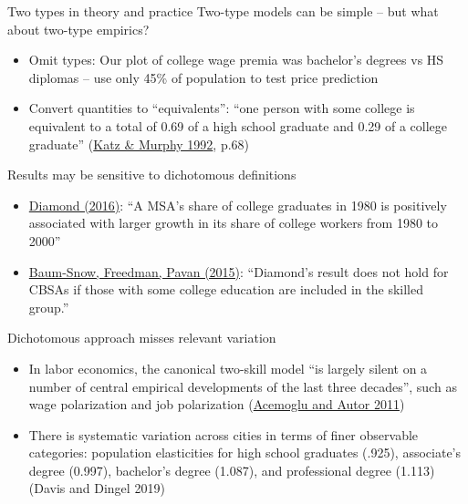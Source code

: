 \documentclass[10pt,notes=hide]{beamer}
\begin{document}
\begin{frame}{Two types in theory and practice}
Two-type models can be simple -- but what about two-type empirics?
\begin{itemize}
	\item Omit types: Our plot of college wage premia was bachelor's degrees vs HS diplomas -- use only 45\% of population to test price prediction
	\item Convert quantities to ``equivalents'': ``one person with some college is equivalent to a total of 0.69 of a high school graduate and 0.29 of a college graduate'' (\href{http://www.jstor.org/stable/2118323}{Katz \& Murphy 1992}, p.68)
\end{itemize}
\pause Results may be sensitive to dichotomous definitions
\begin{itemize}
	\item \href{https://www.aeaweb.org/articles?id=10.1257/aer.20131706}{Diamond (2016)}: ``A MSA's share of college graduates in 1980 is positively associated with larger growth in its share of college workers from 1980 to 2000''
	\item \href{http://www.econ.brown.edu/fac/nathaniel_baum-snow/capital_all_oct2014.pdf}{Baum-Snow, Freedman, Pavan (2015)}: ``Diamond's result does not hold for CBSAs if those with some college education are included in the skilled group.''
\end{itemize}

\end{frame}
\begin{frame}{Dichotomous approach misses relevant variation}
\begin{itemize}
	\item In labor economics, the canonical two-skill model ``is largely silent on a number of central empirical developments of the last three decades'', such as wage polarization and job polarization (\href{http://www.sciencedirect.com/science/article/pii/S0169721811024105}{Acemoglu and Autor 2011})
	\item There is systematic variation across cities in terms of finer observable categories: population elasticities for high school graduates (.925), associate's degree (0.997), bachelor's degree (1.087), and professional degree (1.113) (Davis and Dingel 2019)
\end{itemize}
\end{frame}
\end{document}

